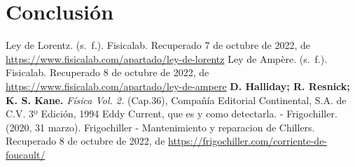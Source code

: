 \documentclass[]{article}
\begin{document}
\section*{Conclusión}


\begin{thebibliography}{5}
    Ley de Lorentz. (s. f.). Fisicalab. Recuperado 7 de octubre de 2022, 
  de \url{https://www.fisicalab.com/apartado/ley-de-lorentz}
  Ley de Ampère. (s. f.). Fisicalab. Recuperado 8 de octubre de 2022, 
  de \url{https://www.fisicalab.com/apartado/ley-de-ampere}
   \textbf{D. Halliday; R. Resnick; K. S. Kane.} \textit{Física Vol. 2.} (Cap.36), Compañía Editorial Continental, S.A. de C.V. 3º Edición, 1994
   Eddy Current, que es y como detectarla. - Frigochiller. (2020, 31 marzo). Frigochiller - Mantenimiento y reparacion de Chillers. Recuperado 8 de octubre de 2022, 
  de \url{https://frigochiller.com/corriente-de-foucault/}
\end{thebibliography}
\end{document}
